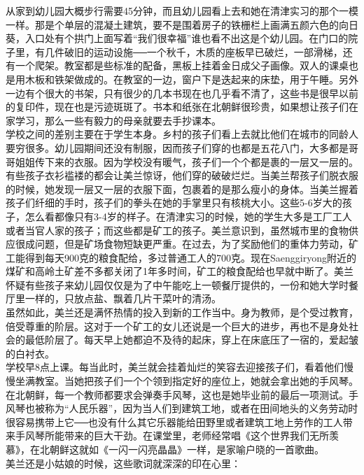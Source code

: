 从家到幼儿园大概步行需要45分钟，而且幼儿园看上去和她在清津实习的那个一模一样。那是个单层的混凝土建筑，要不是围着房子的铁栅栏上画满五颜六色的向日葵，入口处有个拱门上面写着“我们很幸福”谁也看不出这是个幼儿园。在门口的院子里，有几件破旧的运动设施──一个秋千，木质的座板早已破烂，一部滑梯，还有一个爬架。教室都是些标准的配备，黑板上挂着金日成父子画像。双人的课桌也是用木板和铁架做成的。在教室的一边，窗户下是迭起来的床垫，用于午睡。另外一边有个很大的书架，只有很少的几本书现在也几乎看不清了，这些书是很早以前的复印件，现在也是污迹斑斑了。书本和纸张在北朝鲜很珍贵，如果想让孩子们在家学习，那么一些有毅力的母亲就要去手抄课本。\\

学校之间的差别主要在于学生本身。乡村的孩子们看上去就比他们在城市的同龄人要穷很多。幼儿园期间还没有制服，因而孩子们穿的也都是五花八门，大多都是哥哥姐姐传下来的衣服。因为学校没有暖气，孩子们一个个都是裹的一层又一层的。有些孩子衣衫褴褛的都会让美兰惊讶，他们穿的破破烂烂。当美兰帮孩子们脱衣服的时候，她发现一层又一层的衣服下面，包裹着的是那么瘦小的身体。当美兰握着孩子们纤细的手时，孩子们的拳头在她的手掌里只有核桃大小。这些5-6岁大的孩子，怎么看都像只有3-4岁的样子。在清津实习的时候，她的学生大多是工厂工人或者当官人家的孩子；而这些都是矿工的孩子。美兰意识到，虽然城市里的食物供应很成问题，但是矿场食物短缺更严重。在过去，为了奖励他们的重体力劳动，矿工能得到每天900克的粮食配给，多过普通工人的700克。现在Saenggiryong附近的煤矿和高岭土矿差不多都关闭了1年多时间，矿工的粮食配给也早就中断了。美兰怀疑有些孩子来幼儿园仅仅是为了中午能吃上一顿餐厅提供的，一份和她大学时餐厅里一样的，只放点盐、飘着几片干菜叶的清汤。\\

虽然如此，美兰还是满怀热情的投入到新的工作当中。身为教师，是个受过教育，倍受尊重的阶层。这对于一个矿工的女儿还说是一个巨大的进步，再也不是身处社会的最低阶层了。每天早上她都迫不及待的起床，穿上在床底压了一宿的，爱起皱的白衬衣。\\

学校早8点上课。每当此时，美兰就会挂着灿烂的笑容去迎接孩子们，看着他们慢慢坐满教室。当她把孩子们一个个领到指定好的座位上，她就会拿出她的手风琴。在北朝鲜，每一个教师都要求会弹奏手风琴，这也是她毕业前的最后一项测试。手风琴也被称为“人民乐器”，因为当人们到建筑工地，或者在田间地头的义务劳动时很容易携带上它──也没有什么其它乐器能给田野里或者建筑工地上劳作的工人带来手风琴所能带来的巨大干劲。在课堂里，老师经常唱《这个世界我们无所羡慕》，在北朝鲜这就如《一闪一闪亮晶晶》一样，是家喻户晓的一首歌曲。\\

美兰还是小姑娘的时候，这些歌词就深深的印在心里：\\

